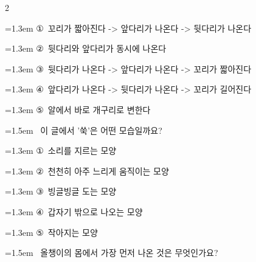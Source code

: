 \documentclass[12pt, a4paper]{article}
\begin{document}
\begin{multicols}{2}
\begin{minipage}{\columnwidth}
\vspace{0.5mm}
{\hangindent=1.3em  \noindent\hspace{0.3em}①~꼬리가 짧아진다 -> 앞다리가 나온다 -> 뒷다리가 나온다\par}
{\hangindent=1.3em  \noindent\hspace{0.3em}②~뒷다리와 앞다리가 동시에 나온다\par}
{\hangindent=1.3em  \noindent\hspace{0.3em}③~뒷다리가 나온다 -> 앞다리가 나온다 -> 꼬리가 짧아진다\par}
{\hangindent=1.3em  \noindent\hspace{0.3em}④~앞다리가 나온다 -> 뒷다리가 나온다 -> 꼬리가 길어진다\par}
{\hangindent=1.3em  \noindent\hspace{0.3em}⑤~알에서 바로 개구리로 변한다\par}
\vspace{4mm}
\end{minipage}
\par

\noindent\begin{minipage}{\columnwidth}
\vspace{2mm}
{\hangindent=1.5em  ~이 글에서 '쑥'은 어떤 모습일까요?\par}

\vspace{0.5mm}
{\hangindent=1.3em  \noindent\hspace{0.3em}①~소리를 지르는 모양\par}
{\hangindent=1.3em  \noindent\hspace{0.3em}②~천천히 아주 느리게 움직이는 모양\par}
{\hangindent=1.3em  \noindent\hspace{0.3em}③~빙글빙글 도는 모양\par}
{\hangindent=1.3em  \noindent\hspace{0.3em}④~갑자기 밖으로 나오는 모양\par}
{\hangindent=1.3em  \noindent\hspace{0.3em}⑤~작아지는 모양\par}
\vspace{4mm}
\end{minipage}
\par

\noindent\begin{minipage}{\columnwidth}
\vspace{2mm}
{\hangindent=1.5em  ~올챙이의 몸에서 가장 먼저 나온 것은 무엇인가요?\par}


\end{minipage}
\end{multicols}
\end{document}

